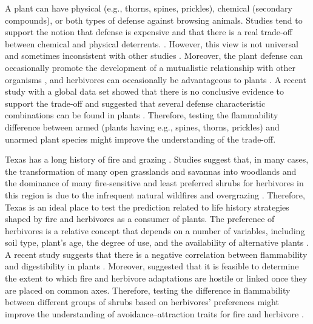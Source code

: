 \documentclass[12pt]{report}
\begin{document}
A plant can have physical (e.g., thorns, spines, prickles), chemical (secondary compounds), or both types of defense against browsing animals. Studies tend to support the notion that defense is expensive and that there is a real trade-off between chemical and physical deterrents. \citep{rhoades1979evolution, van1988defence,twigg1996physicalchemical}. However, this view is not universal and sometimes inconsistent with other studies \citep{iddles2003potentialnegativecorrelation,steward1988theredifferentview,koricheva2004metanegativecorrelation}. Moreover, the plant defense can occasionally promote the development of a mutualistic relationship with other organisms \citep{janzen1966coevolution}, and herbivores can occasionally be advantageous to plants \citep{belsky1986does}. A recent study with a global data set showed that there is no conclusive evidence to support the trade-off and suggested that several defense characteristic combinations can be found in plants \citep{moles2013correlations}. Therefore, testing the flammability difference between armed (plants having e.g., spines, thorns, prickles) and unarmed plant species might improve the understanding of the trade-off.

Texas has a long history of fire \citep{moir1982firehistory, stambaugh2011firehistory,stambaugh2014historicalfirehistory,smeins2005historyoffire1} and grazing \citep{buechner1950lifegrazing, wilcox2012historicalgrazing2}. Studies suggest that, in many cases, the transformation of many open grasslands and savannas into woodlands and the dominance of many fire-sensitive and least preferred shrubs for herbivores in this region is due to the infrequent natural wildfires and overgrazing \citep{archer1989havejoint,andruk2014joint, masters1986prescribed}. Therefore, Texas is an ideal place to test the prediction related to life history strategies shaped by fire and herbivores as a consumer of plants. The preference of herbivores is a relative concept that depends on a number of variables, including soil type, plant's age, the degree of use, and the availability of alternative plants \citep{wright2003white}.  A recent study suggests that there is a negative correlation between flammability and digestibility in plants \citep{gowda2022digestibility}. Moreover, \citep{archibald2019unified} suggested that it is feasible to determine the extent to which fire and herbivore adaptations are hostile or linked once they are placed on common axes. Therefore, testing the difference in flammability between different groups of shrubs based on herbivores' preferences might improve the understanding of avoidance–attraction traits for fire and herbivore \citep{schwilk2003flammability, archibald2019unified}. 
\end{document}
